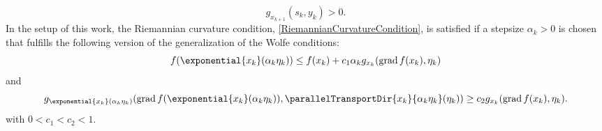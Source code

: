 \begin{equation}\label{RiemannianCurvatureCondition}
    g_{x_{k+1}}(s_k,y_k) > 0.
\end{equation}
In the setup of this work, the Riemannian curvature condition, \cref{RiemannianCurvatureCondition}, is satisfied if a stepsize $\alpha_k > 0$ is chosen that fulfills the following version of the generalization of the Wolfe conditions:
\begin{equation}\label{RiemannianWolfeConditions1}
    f( \exponential{x_k}(\alpha_k \eta_k)) \leq f(x_k) + c_1 \alpha_k g_{x_k} (\operatorname{grad} f(x_k), \eta_k)
\end{equation}
and 
\begin{equation}\label{RiemannianWolfeConditions2.2}
    g_{\exponential{x_k}(\alpha_k \eta_k)} (\operatorname{grad} f(\exponential{x_k}(\alpha_k \eta_k)), \parallelTransportDir{x_k}{\alpha_k \eta_k}(\eta_k)) \geq c_2 g_{x_k} (\operatorname{grad} f(x_k), \eta_k).
\end{equation}
with $0 < c_1 < c_2 < 1$.

